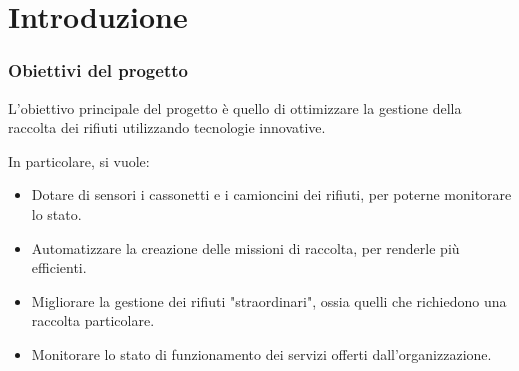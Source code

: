 \section{Introduzione}
\frame{\tableofcontents[currentsection]}


\begin{frame}
    \frametitle{Obiettivi del progetto}
    L'obiettivo principale del progetto è quello di ottimizzare la gestione della raccolta dei rifiuti utilizzando
    tecnologie innovative.

    \bigskip

    In particolare, si vuole:
    \begin{itemize}
        \item Dotare di sensori i cassonetti e i camioncini dei rifiuti, per poterne monitorare lo stato.
        \item Automatizzare la creazione delle missioni di raccolta, per renderle più efficienti.
        \item Migliorare la gestione dei rifiuti "straordinari", ossia quelli che richiedono una raccolta particolare.
        \item Monitorare lo stato di funzionamento dei servizi offerti dall'organizzazione.
    \end{itemize}

\end{frame}
